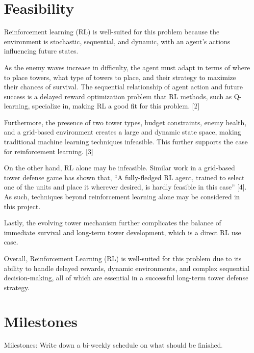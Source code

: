 \documentclass[12pt]{article}
\newcounter{ques}
\begin{document}
\section{Feasibility}

Reinforcement learning (RL) is well-suited for this problem because the environment is stochastic, sequential, and dynamic, with an agent's actions influencing future states. \par 

As the enemy waves increase in difficulty, the agent must adapt in terms of where to place towers, what type of towers to place, and their strategy to maximize their chances of survival. The sequential relationship of agent action and future success is a delayed reward optimization problem that RL methods, such as Q-learning, specialize in, making RL a good fit for this problem. [2] \par

Furthermore, the presence of two tower types, budget constraints, enemy health, and a grid-based environment creates a large and dynamic state space, making traditional machine learning techniques infeasible. This further supports the case for reinforcement learning. [3] \par

On the other hand, RL alone may be infeasible. Similar work in a grid-based tower defense game has shown that, ``A fully-fledged RL agent, trained to select one of the units and place it wherever desired, is hardly feasible in this case'' [4]. As such, techniques beyond reinforcement learning alone may be considered in this project. \par

Lastly, the evolving tower mechanism further complicates the balance of immediate survival and long-term tower development, which is a direct RL use case. \par

Overall, Reinforcement Learning (RL) is well-suited for this problem due to its ability to handle delayed rewards, dynamic environments, and complex sequential decision-making, all of which are essential in a successful long-term tower defense strategy.


\section{Milestones}
Milestones: Write down a bi-weekly schedule on what should be finished.

\vspace{0.5em}
\newpage 
\end{document}
